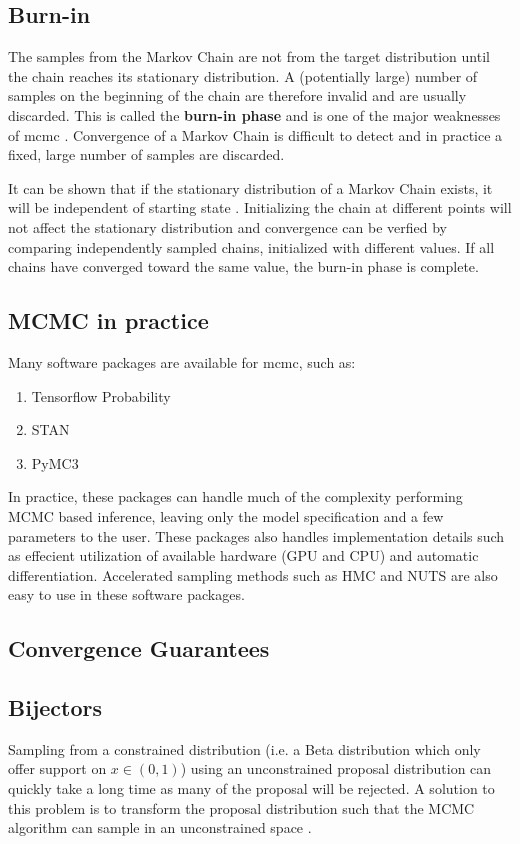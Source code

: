 \subsection{Burn-in}
The samples from the Markov Chain are not from the target distribution until the chain reaches its stationary distribution. A (potentially large) number of samples on the beginning of the chain are therefore invalid and are usually discarded. This is called the \textbf{burn-in phase} and is one of the major weaknesses of \acrshort{mcmc} \cite{murphy}. Convergence of a Markov Chain is difficult to detect and in practice a fixed, large number of samples are discarded.   

It can be shown that if the stationary distribution of a Markov Chain exists, it will be independent of starting state \cite{murphy}. Initializing the chain at different points will not affect the stationary distribution and convergence can be verfied by comparing independently sampled chains, initialized with different values. If all chains have converged toward the same value, the burn-in phase is complete.    

\subsection{MCMC in practice}
Many software packages are available for \acrshort{mcmc}, such as: 

\begin{enumerate}
    \item Tensorflow Probability \cite{tensorflow2015-whitepaper}
    \item STAN \cite{stan}
    \item PyMC3 \cite{pymc3}
\end{enumerate}

In practice, these packages can handle much of the complexity performing MCMC based inference, leaving only the model specification and a few parameters to the user. These packages also handles implementation details such as effecient utilization of available hardware (GPU and CPU) and automatic differentiation. Accelerated sampling methods such as HMC and NUTS are also easy to use in these software packages.   

\subsection{Convergence Guarantees}

\subsection{Bijectors}
Sampling from a constrained distribution (i.e. a Beta distribution which only offer support on $x \in (0, 1)$) using an unconstrained proposal distribution can quickly take a long time as many of the proposal will be rejected. A solution to this problem is to transform the proposal distribution such that the MCMC algorithm can sample in an unconstrained space \cite{Parno_2018, tensorflow2015-whitepaper}. 

